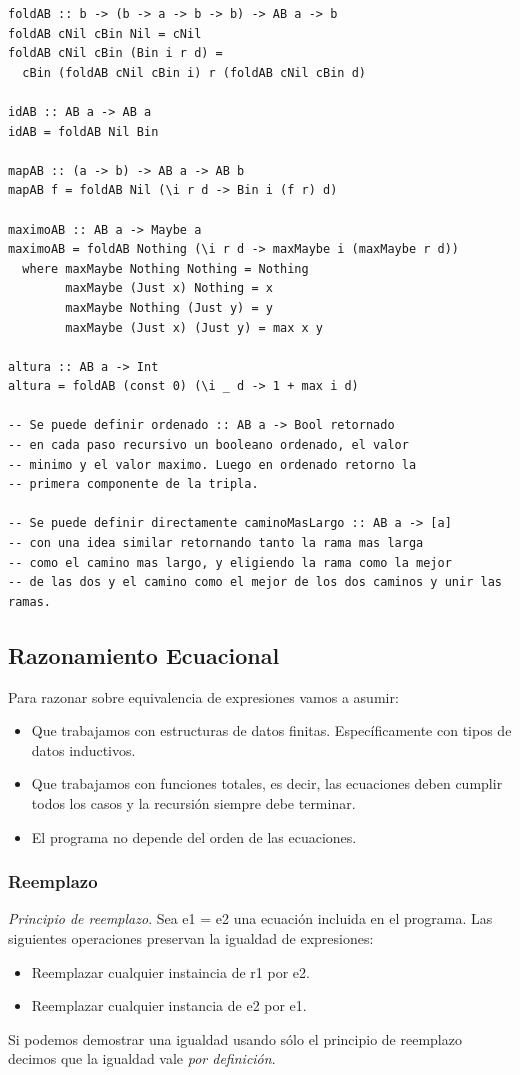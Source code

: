 \documentclass[12pt]{extarticle}
\begin{document}
\begin{verbatim}
foldAB :: b -> (b -> a -> b -> b) -> AB a -> b
foldAB cNil cBin Nil = cNil
foldAB cNil cBin (Bin i r d) =
  cBin (foldAB cNil cBin i) r (foldAB cNil cBin d)

idAB :: AB a -> AB a
idAB = foldAB Nil Bin

mapAB :: (a -> b) -> AB a -> AB b
mapAB f = foldAB Nil (\i r d -> Bin i (f r) d)

maximoAB :: AB a -> Maybe a
maximoAB = foldAB Nothing (\i r d -> maxMaybe i (maxMaybe r d))
  where maxMaybe Nothing Nothing = Nothing
        maxMaybe (Just x) Nothing = x
        maxMaybe Nothing (Just y) = y
        maxMaybe (Just x) (Just y) = max x y

altura :: AB a -> Int
altura = foldAB (const 0) (\i _ d -> 1 + max i d)

-- Se puede definir ordenado :: AB a -> Bool retornado
-- en cada paso recursivo un booleano ordenado, el valor
-- minimo y el valor maximo. Luego en ordenado retorno la
-- primera componente de la tripla.

-- Se puede definir directamente caminoMasLargo :: AB a -> [a]
-- con una idea similar retornando tanto la rama mas larga
-- como el camino mas largo, y eligiendo la rama como la mejor
-- de las dos y el camino como el mejor de los dos caminos y unir las ramas.
\end{verbatim}

\subsection{Razonamiento Ecuacional}

Para razonar sobre equivalencia de expresiones vamos a asumir:
\begin{itemize}
\itemsep-0.35em 
\item Que trabajamos con estructuras de datos finitas. Específicamente con tipos de datos inductivos.
\item Que trabajamos con funciones totales, es decir, las ecuaciones deben cumplir todos los casos y la recursión siempre debe terminar.
\item El programa no depende del orden de las ecuaciones.
\end{itemize}

\subsubsection{Reemplazo}
\textit{Principio de reemplazo}.
Sea e1 = e2 una ecuación incluida en el programa.
Las siguientes operaciones preservan la igualdad de expresiones:
\begin{itemize}
\itemsep-0.35em 
\item Reemplazar cualquier instaincia de r1 por e2.
\item Reemplazar cualquier instancia de e2 por e1.
\end{itemize}
Si podemos demostrar una igualdad usando sólo el principio de reemplazo decimos que la igualdad vale \textit{por definición}.
\end{document}
